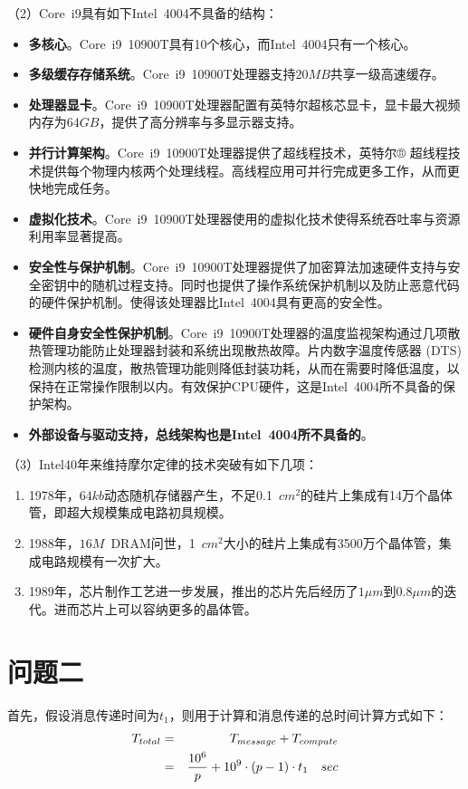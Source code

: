 \documentclass[12pt]{article}
\begin{document}
	（2）Core~i9具有如下Intel~4004不具备的结构：
	\begin{itemize}
		\item \textbf{多核心}。Core~i9~10900T具有10个核心，而Intel~4004只有一个核心。
		\item \textbf{多级缓存存储系统}。Core~i9~10900T处理器支持$20MB$共享一级高速缓存。
		\item \textbf{处理器显卡}。Core~i9~10900T处理器配置有英特尔超核芯显卡，显卡最大视频内存为$64GB$，提供了高分辨率与多显示器支持。
		\item \textbf{并行计算架构}。Core~i9~10900T处理器提供了超线程技术，英特尔® 超线程技术提供每个物理内核两个处理线程。高线程应用可并行完成更多工作，从而更快地完成任务。
		\item \textbf{虚拟化技术}。Core~i9~10900T处理器使用的虚拟化技术使得系统吞吐率与资源利用率显著提高。
		\item \textbf{安全性与保护机制}。Core~i9~10900T处理器提供了加密算法加速硬件支持与安全密钥中的随机过程支持。同时也提供了操作系统保护机制以及防止恶意代码的硬件保护机制。使得该处理器比Intel~4004具有更高的安全性。
		\item \textbf{硬件自身安全性保护机制}。Core~i9~10900T处理器的温度监视架构通过几项散热管理功能防止处理器封装和系统出现散热故障。片内数字温度传感器 (DTS) 检测内核的温度，散热管理功能则降低封装功耗，从而在需要时降低温度，以保持在正常操作限制以内。有效保护CPU硬件，这是Intel~4004所不具备的保护架构。
		\item \textbf{外部设备与驱动支持，总线架构也是Intel~4004所不具备的}。
	\end{itemize}
	（3）Intel40年来维持摩尔定律的技术突破有如下几项：
	\begin{enumerate}
		\item 1978年，$64kb$动态随机存储器产生，不足0.1~$cm^{2}$的硅片上集成有14万个晶体管，即超大规模集成电路初具规模。
		\item 1988年，$16M$~DRAM问世，1~$cm^{2}$大小的硅片上集成有3500万个晶体管，集成电路规模有一次扩大。
		\item 1989年，芯片制作工艺进一步发展，推出的芯片先后经历了$1\mu m$到$0.8\mu m$的迭代。进而芯片上可以容纳更多的晶体管。
	\end{enumerate}
\section{问题二}

	首先，假设消息传递时间为$t_1$，则用于计算和消息传递的总时间计算方式如下：
\begin{eqnarray}\label{px}
	T_{total}&=&T_{message}+T_{compute}\\ \notag
	&=&
	\frac{10^{6}}{p}+10^{9}\cdot(p-1)\cdot t_1 \quad sec
\end{eqnarray}
\end{document}
